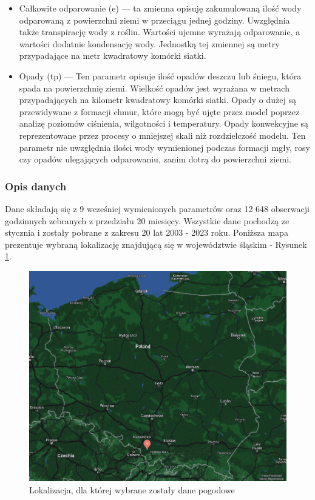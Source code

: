 \begin{itemize}
    \item Całkowite odparowanie (e) — ta zmienna opisuję zakumulowaną ilość wody odparowaną z powierzchni
    ziemi w przeciągu jednej godziny. Uwzględnia także transpirację wody z roślin. Wartości ujemne
    wyrażają odparowanie, a wartości dodatnie kondensację wody. Jednostką tej zmiennej są metry
    przypadające na metr kwadratowy komórki siatki.

    \item Opady (tp) — Ten parametr opisuje ilość opadów deszczu lub śniegu, która spada na powierzchnię ziemi.
    Wielkość opadów jest wyrażana w metrach przypadających na kilometr kwadratowy komórki siatki.
    Opady o dużej są przewidywane z formacji chmur, które mogą być ujęte przez model poprzez 
    analizę poziomów ciśnienia, wilgotności i temperatury. 
    Opady konwekcyjne są reprezentowane przez procesy
    o mniejszej skali niż rozdzielczość modelu. Ten parametr nie uwzględnia ilości wody wymienionej
    podczas formacji mgły, rosy czy opadów ulegających odparowaniu, zanim dotrą do powierzchni ziemi.

\end{itemize}

\subsubsection*{Opis danych}

Dane składają się z 9 wcześniej wymienionych parametrów oraz 12 648 obserwacji godzinnych zebranych
z przedziału 20 miesięcy. Wszystkie dane pochodzą ze stycznia i zostały pobrane z zakresu 20 lat
2003 - 2023 roku. Poniższa mapa prezentuje wybraną lokalizację znajdującą się w województwie śląskim -
Rysunek \ref{map}.

\begin{figure}[H]
    \centering
    \includegraphics[width=\textwidth]{images/map.png}
    \caption{Lokalizacja, dla której wybrane zostały dane pogodowe}
    \label{map}
\end{figure}

